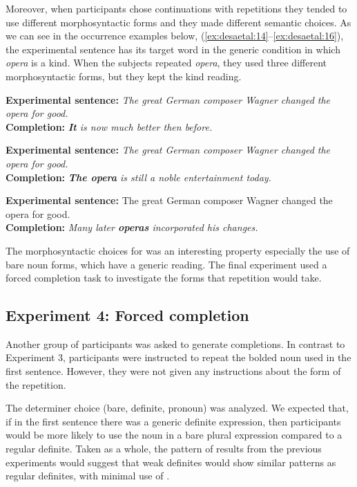 \documentclass[output=paper,
modfonts
]{langscibook}
\begin{document}
Moreover, when participants chose continuations with repetitions they tended to use different morphosyntactic forms and they made different semantic choices. As we can see in the occurrence examples below, (\ref{ex:desaetal:14}--\ref{ex:desaetal:16}), the experimental sentence has its target word in the generic condition in which \textit{opera} is a kind. When the subjects repeated \textit{opera}, they used three different morphosyntactic forms, but they kept the kind reading.

\ea \label{ex:desaetal:14}
\textbf{Experimental sentence:} \textit{The great German composer Wagner changed the opera for good.}
\\ \textbf{Completion:} \textit{\textbf{It} is now much better then before.}
\z

\ea \label{ex:desaetal:15}
\textbf{Experimental sentence:} \textit{The great German composer Wagner changed the opera for good.}
\\ \textbf{Completion:} \textit{\textbf{The opera} is still a noble entertainment today.}
\z

\ea \label{ex:desaetal:16}
\textbf{Experimental sentence:} The great German composer Wagner changed the opera for good.	
\\  \textbf{Completion:} \textit{Many later \textbf{operas} incorporated his changes.} 
\z

The morphosyntactic choices for  was an interesting property especially the use of bare noun forms, which have a generic reading. The final experiment used a forced completion task to investigate the forms that repetition would take.


\subsection{Experiment 4: Forced completion} 
Another group of participants was asked to generate completions. In contrast to Experiment 3,  participants were instructed to repeat the bolded noun used in the first sentence. However, they were not given any instructions about the form of the repetition. 

The determiner choice (bare, definite, pronoun) was analyzed. We expected that, if in the first sentence there was a generic definite expression, then participants would be more likely to use the noun in a bare plural expression compared to a regular definite. Taken as a whole, the pattern of results from the previous experiments would suggest that weak definites would show similar patterns as regular definites, with minimal use of .
\end{document}
